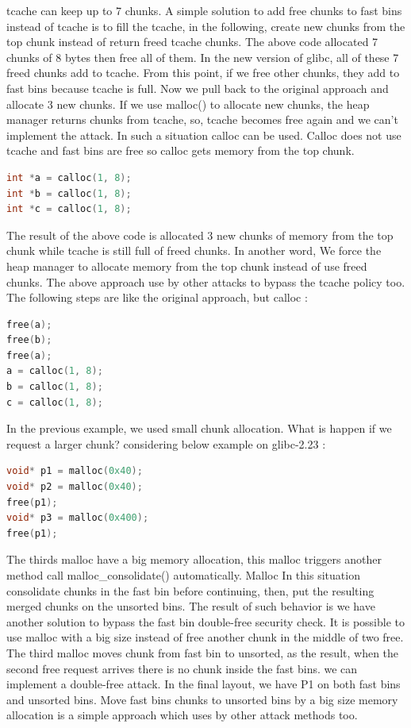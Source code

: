 \documentclass{masterthesis}
\newcommand*\libc{glibc}
\newcommand*\tch{tcache}
\newcommand*\fb{fast bins}
\newcommand*\ub{unsorted bins}
\begin{document}
\tch{} can keep up to 7 chunks. A simple solution to add free chunks to \fb{} instead of \tch{} is to fill the \tch{}, in the following, create new chunks from the top chunk instead of return freed \tch{} chunks. The above code allocated 7 chunks of 8 bytes then free all of them. In the new version of \libc{}, all of these 7 freed chunks add to \tch{}. From this point, if we free other chunks, they add to \fb{} because \tch{} is full. Now we pull back to the original approach and allocate 3 new chunks. If we use malloc() to allocate new chunks, the heap manager returns chunks from \tch{}, so, \tch{} becomes free again and we can’t implement the attack. In such a situation calloc can be used. Calloc does not use \tch{} and \fb{} are free so calloc gets memory from the top chunk. 

\begin{lstlisting}[language=c,frame=tlrb]
int *a = calloc(1, 8);
int *b = calloc(1, 8);
int *c = calloc(1, 8);
\end{lstlisting}

The result of the above code is allocated 3 new chunks of memory from the top chunk while \tch{} is still full of freed chunks. In another word, We force the heap manager to allocate memory from the top chunk instead of use freed chunks. The above approach use by other attacks to bypass the \tch{} policy too. The following steps are like the original approach, but calloc :

\begin{lstlisting}[language=c,frame=tlrb]
free(a);
free(b);
free(a);
a = calloc(1, 8);
b = calloc(1, 8);
c = calloc(1, 8);
\end{lstlisting}

In the previous example, we used small chunk allocation. What is happen if we request a larger chunk? considering below example on \libc{-2.23} :

\begin{lstlisting}[language=c,frame=tlrb]
void* p1 = malloc(0x40);
void* p2 = malloc(0x40);
free(p1);
void* p3 = malloc(0x400);
free(p1);
\end{lstlisting}

The thirds malloc have a big memory allocation, this malloc triggers another method call malloc\_consolidate() automatically. Malloc In this situation consolidate chunks in the fast bin before continuing, then, put the resulting merged chunks on the \ub{}.
The result of such behavior is we have another solution to bypass the fast bin double-free security check. It is possible to use malloc with a big size instead of free another chunk in the middle of two free. The third malloc moves chunk from fast bin to unsorted, as the result, when the second free request arrives there is no chunk inside the \fb{}. we can implement a double-free attack. In the final layout, we have P1 on both \fb{} and \ub{}. Move \fb{} chunks to \ub{} by a big size memory allocation is a simple approach which uses by other attack methods too.
\end{document}
